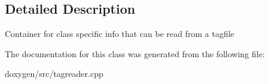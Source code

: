 \subsection{Detailed Description}
Container for class specific info that can be read from a tagfile 

The documentation for this class was generated from the following file\+:\begin{DoxyCompactItemize}
\item 
doxygen/src/tagreader.\+cpp\end{DoxyCompactItemize}
